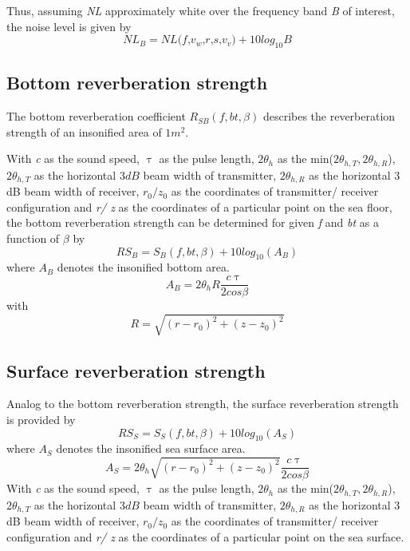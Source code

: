 \noindent Thus, assuming \textit{NL} approximately white over the frequency band \textit{B} of interest, the noise level is given by
\begin{equation}
\textit{$NL_B$} = \textit{NL(f,$v_w$,r,s,$v_v$)} + 10log_{10}{\textit{B}}
\end{equation}

\subsection{ Bottom reverberation strength } \label{ Bottom reverberation strength }
\noindent The bottom reverberation coefficient \textit{$R_{SB}(f,bt,\beta)$} describes the reverberation strength of an insonified area of $1 m^2.$

\noindent With \textit{c} as the sound speed,  $\uptau$ as the pulse length, $2 \theta_{h}$ as the min($2\theta_{h,T}, 2\theta_{h,R}$), $2\theta_{h,T}$ as the horizontal $3 dB$ beam width of transmitter, $2\theta_{h,R}$ as the horizontal 3 dB beam width of receiver, \textit{$r_0/ z_0$} as the coordinates of transmitter/ receiver configuration and \textit{r/ z} as the coordinates of a particular point on the sea floor, the bottom reverberation strength can be determined for given \textit{f} and \textit{bt} as a function of $\beta$ by
\begin{equation}
\textit{$RS_B$} = \textit{$S_{B}(f,bt,\beta)$} + 10 log_{10}{(A_B)}
\end{equation}
\noindent where \textit{$A_B$} denotes the insonified bottom area.
\begin{equation}
\textit{$A_B$} = 2 \theta_{h} R \frac{ c \uptau }{ 2 cos{\beta}}
\end{equation}
\noindent with
\begin{equation}
\textit{R} = \sqrt{ (\textit{r} - \textit{$r_{0}$})^{2} + (\textit{z} - \textit{$z_{0}$})^{2} }
\end{equation}

\subsection{ Surface reverberation strength } \label{ Surface reverberation strength }
\noindent Analog to the bottom reverberation strength, the surface reverberation strength is provided by
\begin{equation}
\textit{$RS_S$} = \textit{$S_{S}(f,bt,\beta)$} + 10 log_{10}{(A_S)}
\end{equation}
\noindent where \textit{$A_S$} denotes the insonified sea surface area.
\begin{equation}
\textit{$A_S$} = 2 \theta_{h} \sqrt{ (\textit{r} - \textit{$r_{0}$})^{2} + (\textit{z} - \textit{$z_{0}$})^{2} } \frac{ c \uptau }{ 2 cos{\beta}}
\end{equation}
\noindent With \textit{c} as the sound speed,  $\uptau$ as the pulse length, $2 \theta_{h}$ as the min($2\theta_{h,T}, 2\theta_{h,R}$), $2\theta_{h,T}$ as the horizontal $3 dB$ beam width of transmitter, $2\theta_{h,R}$ as the horizontal 3 dB beam width of receiver, \textit{$r_0/ z_0$} as the coordinates of transmitter/ receiver configuration and \textit{r/ z} as the coordinates of a particular point on the sea surface.
